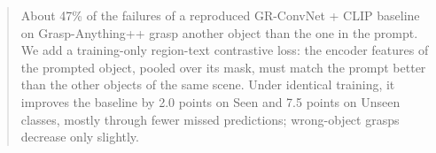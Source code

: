 \begin{abstract}
About 47\% of the failures of a reproduced GR-ConvNet + CLIP baseline on Grasp-Anything++ grasp another object than the one in the prompt.
We add a training-only region-text contrastive loss: the encoder features of the prompted object, pooled over its mask, must match the prompt better than the other objects of the same scene.
Under identical training, it improves the baseline by 2.0 points on Seen and 7.5 points on Unseen classes, mostly through fewer missed predictions; wrong-object grasps decrease only slightly.
\end{abstract}
